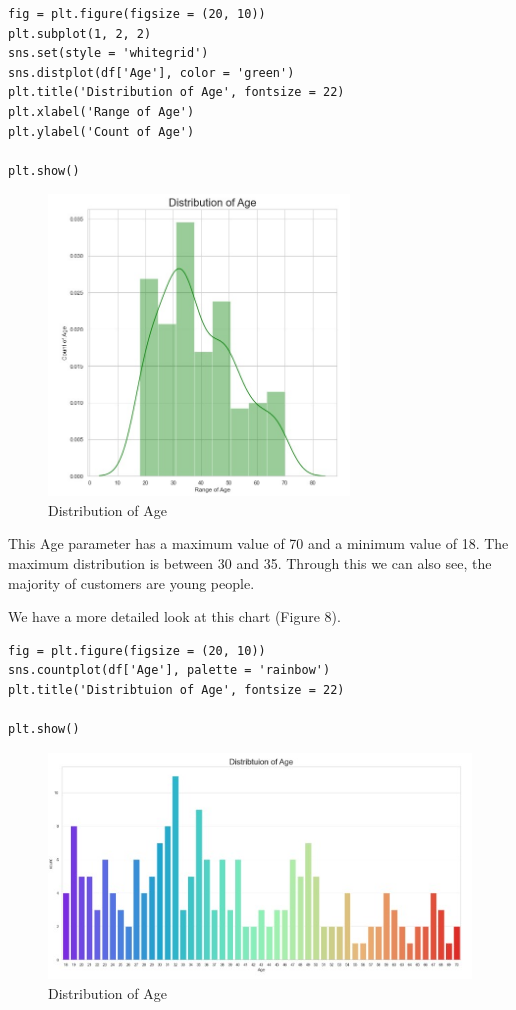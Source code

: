 \documentclass{article}
\begin{document}
\begin{lstlisting}
fig = plt.figure(figsize = (20, 10))
plt.subplot(1, 2, 2)
sns.set(style = 'whitegrid')
sns.distplot(df['Age'], color = 'green')
plt.title('Distribution of Age', fontsize = 22)
plt.xlabel('Range of Age')
plt.ylabel('Count of Age')

plt.show()
\end{lstlisting}
\vspace{10cm}
\begin{figure}[htp]
    \centering
    \includegraphics[width=8cm]{Age.jpg}
    \caption{Distribution of Age}
    \label{fig:Distribution of Age}
\end{figure}


This Age parameter has a maximum value of 70 and a minimum value of 18. The maximum distribution is between 30 and 35.
Through this we can also see, the majority of customers are young people. 

We have a more detailed look at this chart (Figure 8).
\begin{lstlisting}
fig = plt.figure(figsize = (20, 10))
sns.countplot(df['Age'], palette = 'rainbow')
plt.title('Distribtuion of Age', fontsize = 22)

plt.show()
\end{lstlisting}
\begin{figure}[htp]
    \centering
    \includegraphics[width=15cm]{Age (1).jpg}
    \caption{Distribution of Age}
    \label{fig:Distribution of Age}
\end{figure}
\end{document}
